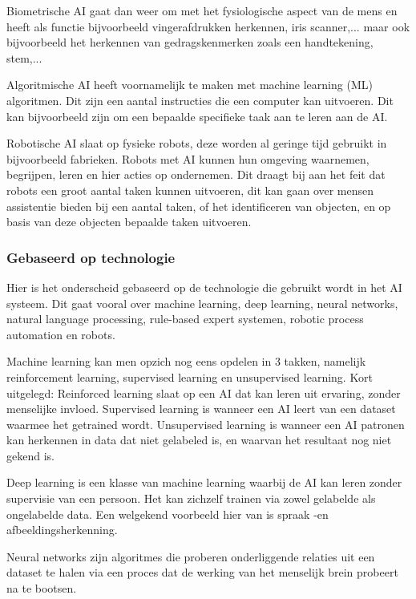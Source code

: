     Biometrische AI gaat dan weer om met het fysiologische aspect van de mens en heeft als functie bijvoorbeeld vingerafdrukken herkennen, iris scanner,... maar ook bijvoorbeeld het herkennen van gedragskenmerken zoals een handtekening, stem,... 
    
    Algoritmische AI heeft voornamelijk te maken met machine learning (ML) algoritmen. Dit zijn een aantal instructies die een computer kan uitvoeren. Dit kan bijvoorbeeld zijn om een bepaalde specifieke taak aan te leren aan de AI.

    Robotische AI slaat op fysieke robots, deze worden al geringe tijd gebruikt in bijvoorbeeld fabrieken. Robots met AI kunnen hun omgeving waarnemen, begrijpen, leren en hier acties op ondernemen. Dit draagt bij aan het feit dat robots een groot aantal taken kunnen uitvoeren, dit kan gaan over mensen assistentie bieden bij een aantal taken, of het identificeren van objecten, en op basis van deze objecten bepaalde taken uitvoeren.

\subsubsection{Gebaseerd op technologie}

    Hier is het onderscheid gebaseerd op de technologie die gebruikt wordt in het AI systeem. Dit gaat vooral over machine learning, deep learning, neural networks, natural language processing, rule-based expert systemen, robotic process automation en robots.
    
    Machine learning kan men opzich nog eens opdelen in 3 takken, namelijk reinforcement learning, supervised learning en unsupervised learning.
    Kort uitgelegd: Reinforced learning slaat op een AI dat kan leren uit ervaring, zonder menselijke invloed. Supervised learning is wanneer een AI leert van een dataset waarmee het getrained wordt. Unsupervised learning is wanneer een AI patronen kan herkennen in data dat niet gelabeled is, en waarvan het resultaat nog niet gekend is.
    
    Deep learning is een klasse van machine learning waarbij de AI kan leren zonder supervisie van een persoon. Het kan zichzelf trainen via zowel gelabelde als ongelabelde data. Een welgekend voorbeeld hier van is spraak -en afbeeldingsherkenning.
    
    Neural networks zijn algoritmes die proberen onderliggende relaties uit een dataset te halen via een proces dat de werking van het menselijk brein probeert na te bootsen.
    
